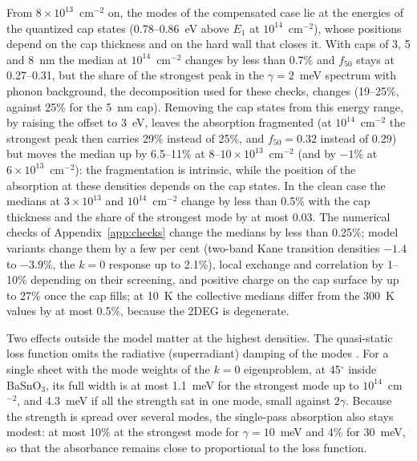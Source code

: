 \documentclass[11pt]{article}
\newcommand{\BSO}{\texorpdfstring{BaSnO$_3$}{BaSnO3}}
\begin{document}
From $8\times10^{13}$~cm$^{-2}$ on, the modes of the compensated case lie at the energies of the quantized cap states (0.78--0.86~eV above $E_1$ at $10^{14}$~cm$^{-2}$), whose positions depend on the cap thickness and on the hard wall that closes it. With caps of 3, 5 and 8~nm the median at $10^{14}$~cm$^{-2}$ changes by less than 0.7\% and $f_{50}$ stays at 0.27--0.31, but the share of the strongest peak in the $\gamma=2$~meV spectrum with phonon background, the decomposition used for these checks, changes (19--25\%, against 25\% for the 5~nm cap). Removing the cap states from this energy range, by raising the offset to 3~eV, leaves the absorption fragmented (at $10^{14}$~cm$^{-2}$ the strongest peak then carries 29\% instead of 25\%, and $f_{50}=0.32$ instead of 0.29) but moves the median up by 6.5--11\% at 8--$10\times10^{13}$~cm$^{-2}$ (and by $-1$\% at $6\times10^{13}$~cm$^{-2}$): the fragmentation is intrinsic, while the position of the absorption at these densities depends on the cap states. In the clean case the medians at $3\times10^{13}$ and $10^{14}$~cm$^{-2}$ change by less than 0.5\% with the cap thickness and the share of the strongest mode by at most 0.03. The numerical checks of Appendix~\ref{app:checks} change the medians by less than 0.25\%; model variants change them by a few per cent (two-band Kane transition densities $-1.4$ to $-3.9$\%, the $k=0$ response up to 2.1\%), local exchange and correlation by 1--10\% depending on their screening, and positive charge on the cap surface by up to 27\% once the cap fills; at 10~K the collective medians differ from the 300~K values by at most 0.5\%, because the 2DEG is degenerate.

Two effects outside the model matter at the highest densities. The quasi-static loss function omits the radiative (superradiant) damping of the modes \cite{Vasanelli2020}. For a single sheet with the mode weights of the $k=0$ eigenproblem, at 45$^\circ$ inside \BSO, its full width is at most 1.1~meV for the strongest mode up to $10^{14}$~cm$^{-2}$, and 4.3~meV if all the strength sat in one mode, small against $2\gamma$. Because the strength is spread over several modes, the single-pass absorption also stays modest: at most 10\% at the strongest mode for $\gamma=10$~meV and 4\% for 30~meV, so that the absorbance remains close to proportional to the loss function.
\end{document}

